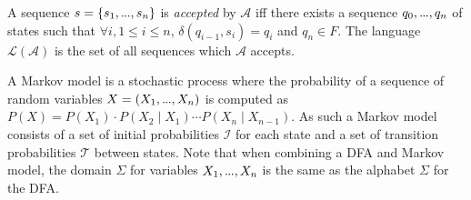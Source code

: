\documentclass[phd,electronic,oneside,twosidetoc,letterpaper,chaptercenter,parttop,lof,lot]{byumsphd}
\newcommand\mydots{\hbox to .75em{.\hss.\hss.}}
\begin{document}
A sequence $s = \{s_1,\mydots,s_n\}$ is \textit{accepted} by $\mathcal{A}$ iff there exists a sequence $q_0,\mydots, q_n$ of states such that $\forall i, 1 \leq i \leq n$, $\delta(q_{i-1},s_i) = q_i$ and $q_n\in F$. The language $\mathcal{L}(\mathcal{A})$ is the set of all sequences which $\mathcal{A}$ accepts.

A Markov model is a stochastic process where the probability of a sequence of random variables $X=(X_1,\mydots,X_n)$ is computed as $P(X)=P(X_1)\cdot P(X_2\mid X_1)\cdots P(X_n\mid X_{n-1})$. As such a Markov model consists of a set of initial probabilities $\mathcal{I}$ for each state and a set of transition probabilities $\mathcal{T}$ between states. Note that when combining a DFA and Markov model, the domain $\Sigma$ for variables $X_1,\mydots,X_n$ is the same as the alphabet $\Sigma$ for the DFA.
\newcommand{\gbfs}{\ensuremath{\mbox{\sc Relational Automaton}}}
\renewcommand{\algorithmicrequire}{\textbf{Data:}}
\renewcommand{\algorithmicensure}{\textbf{Result:}}
\end{document}
